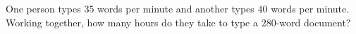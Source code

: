 One person types $35$ words per minute and another types $40$ words per minute. Working together, how many hours do they take to type a $280$-word document?

